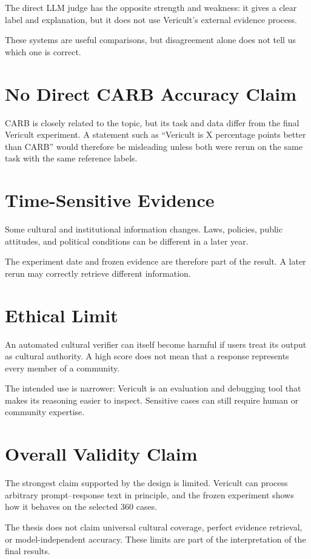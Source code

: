 The direct LLM judge has the opposite strength and weakness: it gives a clear label and explanation, but it does not use Vericult's external evidence process.

These systems are useful comparisons, but disagreement alone does not tell us which one is correct.

\section{No Direct CARB Accuracy Claim}

CARB is closely related to the topic, but its task and data differ from the final Vericult experiment. A statement such as ``Vericult is X percentage points better than CARB'' would therefore be misleading unless both were rerun on the same task with the same reference labels.

\section{Time-Sensitive Evidence}

Some cultural and institutional information changes. Laws, policies, public attitudes, and political conditions can be different in a later year.

The experiment date and frozen evidence are therefore part of the result. A later rerun may correctly retrieve different information.

\section{Ethical Limit}

An automated cultural verifier can itself become harmful if users treat its output as cultural authority. A high score does not mean that a response represents every member of a community.

The intended use is narrower: Vericult is an evaluation and debugging tool that makes its reasoning easier to inspect. Sensitive cases can still require human or community expertise.

\section{Overall Validity Claim}

The strongest claim supported by the design is limited. Vericult can process arbitrary prompt--response text in principle, and the frozen experiment shows how it behaves on the selected 360 cases.

The thesis does not claim universal cultural coverage, perfect evidence retrieval, or model-independent accuracy. These limits are part of the interpretation of the final results.
